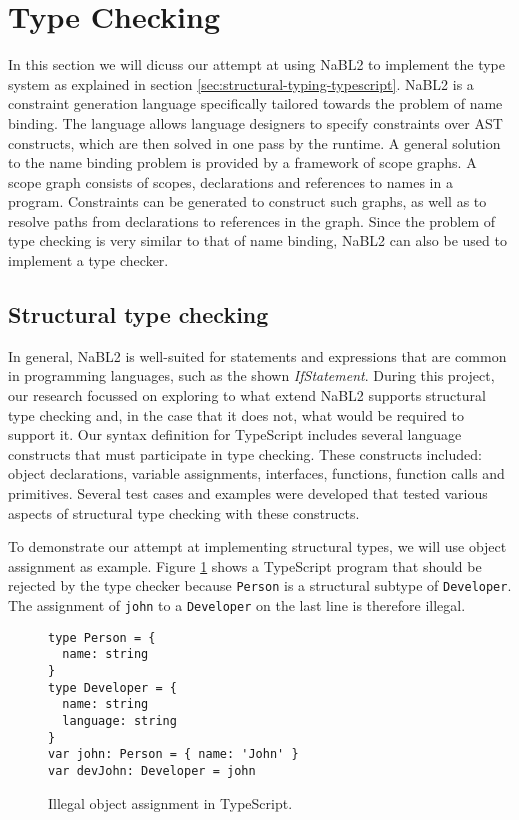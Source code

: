 \section{Type Checking}
\label{sec:type-checking}

In this section we will dicuss our attempt at using NaBL2 \citep{Antwerpen:2016:CLS:2847538.2847543} to implement the type system as explained in section \ref{sec:structural-typing-typescript}.
NaBL2 is a constraint generation language specifically tailored towards the problem of name binding.
The language allows language designers to specify constraints over AST constructs, which are then solved in one pass by the runtime.
A general solution to the name binding problem is provided by a framework of scope graphs.
A scope graph consists of scopes, declarations and references to names in a program.
Constraints can be generated to construct such graphs, as well as to resolve paths from declarations to references in the graph.
Since the problem of type checking is very similar to that of name binding, NaBL2 can also be used to implement a type checker.

\subsection{Structural type checking}

In general, NaBL2 is well-suited for statements and expressions that are common in programming languages, 
such as the shown \textit{IfStatement}.
During this project, our research focussed on exploring to what extend NaBL2 supports structural type checking and, 
in the case that it does not, what would be required to support it.
Our syntax definition for TypeScript includes several language constructs that must participate in type checking.
These constructs included: object declarations, variable assignments, interfaces, functions, function calls and primitives.
Several test cases and examples were developed that tested various aspects of structural type checking with these constructs.

To demonstrate our attempt at implementing structural types, we will use object assignment as example.
Figure \ref{fig:running-example} shows a TypeScript program that should be rejected by the type checker 
because \texttt{Person} is a structural subtype of \texttt{Developer}. 
The assignment of \texttt{john} to a \texttt{Developer} on the last line is therefore illegal.
\begin{figure}[H]
\begin{lstlisting}
type Person = {
  name: string
}
type Developer = {
  name: string
  language: string
}
var john: Person = { name: 'John' }
var devJohn: Developer = john
\end{lstlisting}
\caption{Illegal object assignment in TypeScript.}
\label{fig:running-example}
\end{figure}

